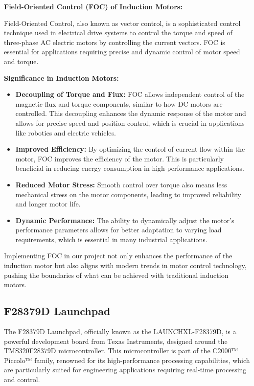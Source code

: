 \textbf{Field-Oriented Control (FOC) of Induction Motors:}

Field-Oriented Control, also known as vector control, is a sophisticated control technique used in electrical drive systems to control the torque and speed of three-phase AC electric motors by controlling the current vectors. FOC is essential for applications requiring precise and dynamic control of motor speed and torque.

\textbf{Significance in Induction Motors:}
\begin{itemize}
    \item \textbf{Decoupling of Torque and Flux:} FOC allows independent control of the magnetic flux and torque components, similar to how DC motors are controlled. This decoupling enhances the dynamic response of the motor and allows for precise speed and position control, which is crucial in applications like robotics and electric vehicles.
    \item \textbf{Improved Efficiency:} By optimizing the control of current flow within the motor, FOC improves the efficiency of the motor. This is particularly beneficial in reducing energy consumption in high-performance applications.
    \item \textbf{Reduced Motor Stress:} Smooth control over torque also means less mechanical stress on the motor components, leading to improved reliability and longer motor life.
    \item \textbf{Dynamic Performance:} The ability to dynamically adjust the motor's performance parameters allows for better adaptation to varying load requirements, which is essential in many industrial applications.
\end{itemize}

Implementing FOC in our project not only enhances the performance of the induction motor but also aligns with modern trends in motor control technology, pushing the boundaries of what can be achieved with traditional induction motors.


\subsection{F28379D Launchpad}

The F28379D Launchpad, officially known as the LAUNCHXL-F28379D, is a powerful development board from Texas Instruments, designed around the TMS320F28379D microcontroller. This microcontroller is part of the C2000™ Piccolo™ family, renowned for its high-performance processing capabilities, which are particularly suited for engineering applications requiring real-time processing and control.

